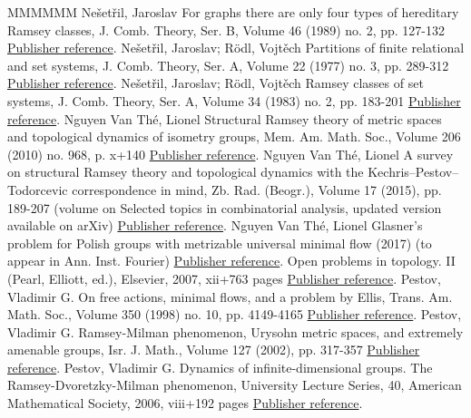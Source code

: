 \begin{thebibliography}{MMMMMM}
 Nešetřil, Jaroslav For graphs there are only four types of hereditary Ramsey classes, J. Comb. Theory, Ser. B, Volume 46 (1989) no. 2, pp. 127-132 \href{https://ahl.centre-mersenne.org/item/AHL_2019__2__149_0/#Ne1}{Publisher reference}.
 Nešetřil, Jaroslav; Rödl, Vojtěch Partitions of finite relational and set systems, J. Comb. Theory, Ser. A, Volume 22 (1977) no. 3, pp. 289-312 \href{https://ahl.centre-mersenne.org/item/AHL_2019__2__149_0/#NR1}{Publisher reference}.
 Nešetřil, Jaroslav; Rödl, Vojtěch Ramsey classes of set systems, J. Comb. Theory, Ser. A, Volume 34 (1983) no. 2, pp. 183-201 \href{https://ahl.centre-mersenne.org/item/AHL_2019__2__149_0/#NR2}{Publisher reference}.
 Nguyen Van Thé, Lionel Structural Ramsey theory of metric spaces and topological dynamics of isometry groups, Mem. Am. Math. Soc., Volume 206 (2010) no. 968, p. x+140 \href{https://ahl.centre-mersenne.org/item/AHL_2019__2__149_0/#NVT1}{Publisher reference}.
 Nguyen Van Thé, Lionel A survey on structural Ramsey theory and topological dynamics with the Kechris–Pestov–Todorcevic correspondence in mind, Zb. Rad. (Beogr.), Volume 17 (2015), pp. 189-207 (volume on Selected topics in combinatorial analysis, updated version available on arXiv) \href{https://ahl.centre-mersenne.org/item/AHL_2019__2__149_0/#NVT6}{Publisher reference}.
 Nguyen Van Thé, Lionel Glasner’s problem for Polish groups with metrizable universal minimal flow (2017) (to appear in Ann. Inst. Fourier) \href{https://ahl.centre-mersenne.org/item/AHL_2019__2__149_0/#NVT8}{Publisher reference}.
 Open problems in topology. II (Pearl, Elliott, ed.), Elsevier, 2007, xii+763 pages \href{https://ahl.centre-mersenne.org/item/AHL_2019__2__149_0/#OT}{Publisher reference}.
 Pestov, Vladimir G. On free actions, minimal flows, and a problem by Ellis, Trans. Am. Math. Soc., Volume 350 (1998) no. 10, pp. 4149-4165 \href{https://ahl.centre-mersenne.org/item/AHL_2019__2__149_0/#Pe1}{Publisher reference}.
 Pestov, Vladimir G. Ramsey-Milman phenomenon, Urysohn metric spaces, and extremely amenable groups, Isr. J. Math., Volume 127 (2002), pp. 317-357 \href{https://ahl.centre-mersenne.org/item/AHL_2019__2__149_0/#Pe0}{Publisher reference}.
 Pestov, Vladimir G. Dynamics of infinite-dimensional groups. The Ramsey-Dvoretzky-Milman phenomenon, University Lecture Series, 40, American Mathematical Society, 2006, viii+192 pages \href{https://ahl.centre-mersenne.org/item/AHL_2019__2__149_0/#Pe}{Publisher reference}.

\end{thebibliography}
